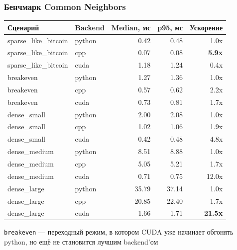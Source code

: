 \documentclass[aspectratio=169]{beamer}
\begin{document}
\begin{frame}
  \frametitle{Бенчмарк Common Neighbors}
  \begin{table}
  \footnotesize
  \begin{tabular}{llrrr}
    \toprule
    \textbf{Сценарий} & \textbf{Backend} & \textbf{Median, мс} & \textbf{p95, мс} & \textbf{Ускорение} \\
    \midrule
    sparse\_like\_bitcoin & python & 0.42 & 0.48 & 1.0x \\
    sparse\_like\_bitcoin & cpp    & 0.07 & 0.08 & \textbf{5.9x} \\
    sparse\_like\_bitcoin & cuda   & 1.18 & 1.24 & 0.4x \\
    \midrule
    breakeven            & python & 1.27 & 1.36 & 1.0x \\
    breakeven            & cpp    & 0.57 & 0.62 & 2.2x \\
    breakeven            & cuda   & 0.73 & 0.81 & 1.7x \\
    \midrule
    dense\_small         & python & 2.00 & 2.08 & 1.0x \\
    dense\_small         & cpp    & 1.02 & 1.06 & 1.9x \\
    dense\_small         & cuda   & 0.42 & 0.48 & 4.8x \\
    \midrule
    dense\_medium        & python & 8.51 & 8.88 & 1.0x \\
    dense\_medium        & cpp    & 5.05 & 5.21 & 1.7x \\
    dense\_medium        & cuda   & 0.71 & 0.75 & 12.0x \\
    \midrule
    dense\_large         & python & 35.79 & 37.14 & 1.0x \\
    dense\_large         & cpp    & 20.85 & 22.40 & 1.7x \\
    dense\_large         & cuda   & 1.66 & 1.71 & \textbf{21.5x} \\
    \bottomrule
  \end{tabular}
  \end{table}
  {\small \texttt{breakeven} — переходный режим, в котором CUDA уже начинает обгонять python, но ещё не становится лучшим backend'ом}
\end{frame}
\end{document}
